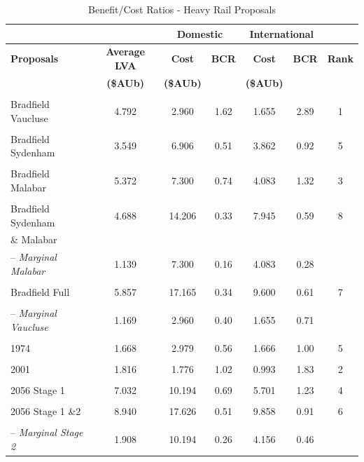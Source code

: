 \documentclass[preprint,12pt,authoryear]{elsarticle}
\begin{document}
\begin{table}[H]
\centering
 
\caption{Benefit/Cost Ratios - Heavy Rail Proposals}\label{bcr heavy}

\begin{tabular}{p{4cm}cccccc}
    \toprule 
    & &\multicolumn{2}{c}{\textbf{Domestic}}& \multicolumn{2}{c}{\textbf{International}}&\\
    \midrule

    \textbf{Proposals}& \textbf{Average LVA }& \textbf{Cost}& \textbf{BCR}& \textbf{Cost }& \textbf{BCR}& \textbf{Rank}\\
 & \textbf{ (\$AUb)}& \textbf{(\$AUb)}& & \textbf{ (\$AUb)}& &\\
    \midrule
 & & & & & & \\
 Bradfield Vaucluse& 4.792& 2.960& 1.62& 1.655& 2.89
& 1\\
 & & 
& 
& 
& 

&
\\
 Bradfield Sydenham& 3.549& 6.906& 0.51& 3.862& 0.92
& 5\\
 & & 
& 
& 
& 

&
\\
 Bradfield Malabar& 5.372& 7.300& 0.74& 4.083& 1.32
&3\\
 & & 
& 
& 
& 

&
\\
 Bradfield Sydenham & 4.688& 14.206& 0.33& 7.945& 0.59
&8\\
 \& Malabar& & 
& 
& 
& 

&
\\
-- \textit{Marginal Malabar}& 1.139& 7.300& 0.16& 4.083& 0.28
&
\\
 & & 
& 
& 
& 

&
\\
 Bradfield Full& 5.857& 17.165& 0.34& 9.600& 0.61
&7\\
 & & 
& 
& 
& 

&
\\
-- \textit{Marginal Vaucluse}& 1.169& 2.960& 0.40& 1.655& 
0.71
&
\\
 & & 
& 
& 
& 

&
\\
 1974 & 1.668& 2.979& 0.56& 1.666& 1.00
&5\\
 & & 
& 
& 
& 

&

\\
 2001 & 1.816& 1.776& 1.02& 0.993& 1.83
&2\\
 & & & & & 
&
\\
 2056 Stage 1 
& 7.032& 10.194& 0.69& 5.701& 1.23
&4\\
 & & & & & &\\
 2056 Stage 1 \&2 
& 8.940& 17.626& 0.51& 9.858& 0.91
&6\\
 & & & & & &\\
-- \textit{Marginal Stage 2}
& 1.908& 10.194& 0.26& 4.156& 0.46
&\\
\bottomrule
\end{tabular}
\end{table}
\end{document}
